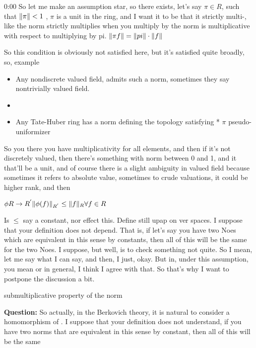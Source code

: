 \begin{unfinished}{0:00}
So let me make an assumption star, so there exists, let's say $\pi \in R$, such that $\| \pi \| < 1$ , $\pi$ is a unit in the ring, and I want it to be that it strictly multi-, like the norm strictly multiplies when you multiply by the norm is multiplicative with respect to multiplying by pi. $\| \pi f \| = \| pi \| \cdot \| f \|$

So this condition is obviously not satisfied here, but it's satisfied quite broadly, so, example

\begin{example}
\begin{itemize}
\item Any nondiscrete valued field, admits such a norm, sometimes they say nontrivially valued field. 
\item 
\item Any Tate-Huber ring has a norm defining the topology satisfying * $\pi$ pseudo-uniformizer %
\end{itemize}

\end{example}
So you there you have multiplicativity for all elements, and then if it's not discretely valued, then there's something with norm between 0 and 1, and it that'll be a unit, and of course there is a slight ambiguity in valued field because sometimes it refers to absolute value, sometimes to crude valuations, it could be higher rank, and then

$
\phi R \to R^{'}
\| \phi(f) \|_{R^{'}} \leq \| f \|_{R} \forall f \in R
$

Is $\leq$ say a constant, nor effect this. Define still upap on ver spaces. I suppose that your definition does not depend. That is, if let's say you have two Noes which are equivalent in this sense by constants, then all of this will be the same for the two Noes. I suppose, but well, is to check something not quite. So I mean, let me say what I can say, and then, I just, okay. But in, under this assumption, you mean or in general, I think I agree with that. So that's why I want to postpone the discussion a bit. 

submultiplicative property of the norm

\textbf{Question:} So actually, in the Berkovich theory,  it is natural to consider a homomorphism of .
I suppose that your definition does not understand, if you have two norms that are equivalent in this sense by constant, then all of this will be the same


\end{unfinished}
